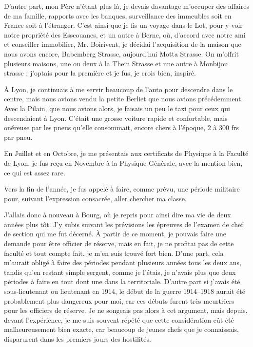\documentclass[11pt,a4paper]{report}
\begin{document}
D'autre part, mon Père n'étant plus là, je devais davantage m'occuper des affaires de ma famille, rapports avec les banques, surveillance des immeubles soit en France soit à l'étranger. C'est ainsi que je fis un voyage dans le Lot, pour y voir notre propriété des Esscouanes, et un autre à Berne, où, d'accord avec notre ami et conseiller immobilier, Mr. Boirivent, je décidai l'acquisition de la maison que nous avons encore, Babemberg Strasse, aujourd'hui Motta Strasse. On m'offrit plusieurs maisons, une ou deux à la Thein Strasse et une autre à Monbijou strasse ; j'optais pour la première et je fus, je crois bien, inspiré.

À Lyon, je continuais à me servir beaucoup de l'auto pour descendre dans le centre, mais nous avions vendu la petite Berliet que nous avions précédemment. Avec la Pilain, que nous avions alors, je faisais un peu le taxi pour ceux qui descendaient à Lyon. C'était une grosse voiture rapide et confortable, mais onéreuse par les pneus qu'elle consommait, encore chers à l'époque, 2 à 300 frs par pneu.

En Juillet et en Octobre, je me présentais aux certificats de Physique à la Faculté de Lyon, je fus reçu en Novembre à la Physique Générale, avec la mention bien, ce qui est assez rare.

Vers la fin de l'année, je fus appelé à faire, comme prévu, une période militaire pour, suivant l'expression consacrée, aller chercher ma classe.

J'allais donc à nouveau à Bourg, où je repris pour ainsi dire ma vie de deux années plus tôt. J'y subis suivant les prévisions les épreuves de l'examen de chef de section qui me fut décerné. À partir de ce moment, je pouvais faire une demande pour être officier de réserve, mais en fait, je ne profitai pas de cette faculté et tout compte fait, je m'en suis trouvé fort bien. D'une part, cela m'aurait obligé à faire des périodes pendant plusieurs années tous les deux ans, tandis qu'en restant simple sergent, comme je l'étais, je n'avais plus que deux périodes à faire en tout dont une dans la territoriale. D'autre part si j'avais été sous-lieutenant ou lieutenant en 1914, le début de la guerre 1914--1918 aurait été probablement plus dangereux pour moi, car ces débuts furent très meurtriers pour les officiers de réserve. Je ne songeais pas alors à cet argument, mais depuis, devant l'expérience, je me suis souvent répété que cette considération eût été malheureusement bien exacte, car beaucoup de jeunes chefs que je connaissais, disparurent dans les premiers jours des hostilités.
\end{document}
